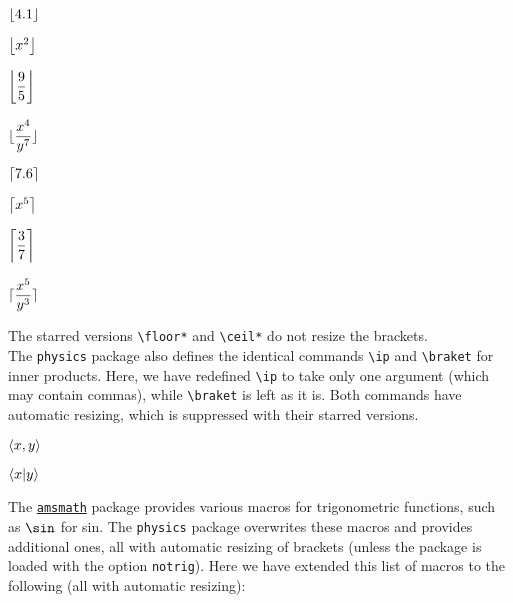 \documentclass[10pt]{extarticle}
\newcommand{\<}{\langle}
\renewcommand{\>}{\rangle}
\theoremstyle{mystyle}{\newtheorem*{remark}{Remark}}
\theoremstyle{mystyle}{\newtheorem*{remarks}{Remarks}}
\theoremstyle{mystyle}{\newtheorem*{example}{Example}}
\theoremstyle{mystyle}{\newtheorem*{examples}{Examples}}
\theoremstyle{definition}{\newtheorem*{exercise}{Exercise}}
\theoremstyle{warn}
\begin{document}
\begin{multicols}{2}
\begin{verbbox}[righthand width=3cm]
$\floor{4.1}$
\end{verbbox}
\begin{verbbox}[righthand width=3cm]
$\floor{x^2}$
\end{verbbox}
\begin{verbbox}[righthand width=3cm]
$\floor{\dfrac{9}{5}}$
\end{verbbox}
\begin{verbbox}[righthand width=3cm]
$\floor*{\dfrac{x^4}{y^7}}$
\end{verbbox}
\begin{verbbox}[righthand width=3cm]
$\ceil{7.6}$
\end{verbbox}
\begin{verbbox}[righthand width=3cm]
$\ceil{x^5}$
\end{verbbox}
\begin{verbbox}[righthand width=3cm]
$\ceil{\dfrac{3}{7}}$
\end{verbbox}
\begin{verbbox}[righthand width=3cm]
$\ceil*{\dfrac{x^5}{y^3}}$
\end{verbbox}
\end{multicols}

The starred versions \verb!\floor*! and \verb!\ceil*! do not resize the brackets.\\

The \texttt{physics} package also defines the identical commands \verb!\ip! and \verb!\braket! for inner products. Here, we have redefined \verb!\ip! to take only one argument (which may contain commas), while \verb!\braket! is left as it is. Both commands have automatic resizing, which is suppressed with their starred versions.

\begin{multicols}{2}
\begin{verbbox}
$\ip{x,y}$
\end{verbbox}
\begin{verbbox}
$\braket{x}{y}$
\end{verbbox}
\end{multicols}

The \href{https://ctan.org/pkg/amsmath}{\texttt{amsmath}} package provides various macros for trigonometric functions, such as $\verb!\sin!$ for sin. The \texttt{physics} package overwrites these macros and provides additional ones, all with automatic resizing of brackets (unless the package is loaded with the option \texttt{notrig}). Here we have extended this list of macros to the following (all with automatic resizing):
\end{document}
